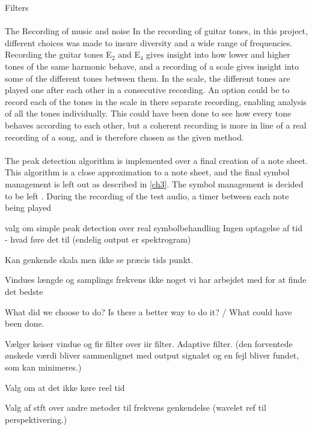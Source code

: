 Filters
\\\\
The Recording of music and noise 
In the recording of guitar tones, in this project, different choices was made to insure diversity and a wide range of frequencies.
Recording the guitar tones E$_2$ and E$_4$ gives insight into how lower and higher tones of the same harmonic behave, and a recording of a scale gives insight into some of the different tones between them.
In the scale, the different tones are played one after each other in a consecutive recording. 
An option could be to record each of the tones in the scale in there separate recording, enabling analysis of all the tones individually.
This could have been done to see how every tone behaves according to each other, but a coherent recording is more in line of a real recording of a song, and is therefore chosen as the given method.
\\\\
The peak detection algorithm is implemented over a final creation of a note sheet.
This algorithm is a close approximation to a note sheet, and the final symbol management is left out as described in \ref{ch3}.
The symbol management is decided to be left .
During the recording of the test audio, a timer between each note being played 
 
valg om simple peak detection over real symbolbehandling
Ingen optagelse af tid - hvad føre det til
(endelig output er spektrogram)

Kan genkende skala men ikke se præcis tids punkt.

Vindues længde og samplings frekvens ikke noget vi har arbejdet med for at finde det bedste


What did we choose to do? Is there a better way to do it? / What could have been done.


Vælger keiser vindue og fir filter
over iir filter.
Adaptive filter. (den forventede ønskede værdi bliver sammenlignet med output signalet og en fejl bliver fundet, som kan minimeres.)

Valg om at det ikke køre reel tid


Valg af stft over andre metoder til frekvens genkendelse (wavelet ref til perspektivering.)



